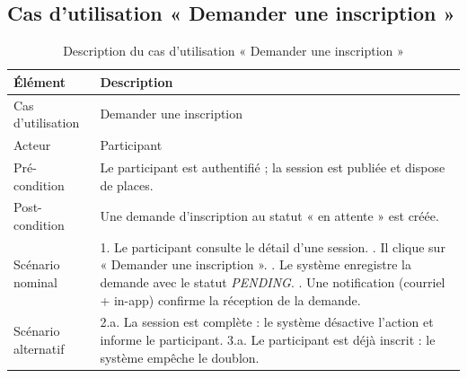 \documentclass[12pt,a4paper,oneside]{report}
\begin{document}
\subsection{Cas d'utilisation « Demander une inscription »}
\begin{table}[H]\centering\renewcommand{\arraystretch}{1.25}
\begin{tabular}{|p{3.4cm}|p{10.3cm}|}\hline
\rowcolor{gray!15}\textbf{Élément} & \textbf{Description} \\ \hline
Cas d'utilisation & Demander une inscription \\ \hline
Acteur & Participant \\ \hline
Pré-condition & Le participant est authentifié ; la session est publiée et dispose de places. \\ \hline
Post-condition & Une demande d'inscription au statut « en attente » est créée. \\ \hline
Scénario nominal &
1. Le participant consulte le détail d'une session. \newline
2. Il clique sur « Demander une inscription ». \newline
3. Le système enregistre la demande avec le statut \textit{PENDING}. \newline
4. Une notification (courriel + in-app) confirme la réception de la demande. \\ \hline
Scénario alternatif &
2.a. La session est complète : le système désactive l'action et informe le participant. \newline
3.a. Le participant est déjà inscrit : le système empêche le doublon. \\ \hline
\end{tabular}
\caption{Description du cas d'utilisation « Demander une inscription »}\label{tab:uc-ins}
\end{table}
\end{document}
